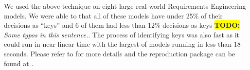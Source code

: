 \documentclass[sigconf,anonymous,review]{acmart}
\newcommand\TODO[1]{\textcolor{ScarletRed}{\textbf{\colorbox{yellow}{\small TODO:}} \emph{#1}}\xspace}
\begin{document}
We used the above technique on eight large real-world Requirements Engineering models. We were able to that all of these models have under 25\% of their decisions as ``keys'' and 6 of them had less than 12\% decisions as keys \TODO{Some typos in this sentence.}. The process of identifying keys was also fast as it could run in near linear time with the largest of models running in less than 18 seconds. Please refer to \cite{mathew2017shorter} for more details and the reproduction package can be found at .


   

   
\end{document}
